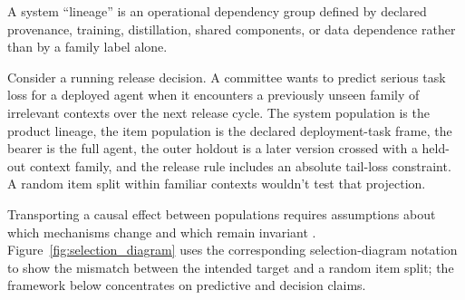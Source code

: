 \documentclass[12pt]{article}
\begin{document}
A system \enquote{lineage} is an operational dependency group defined by declared provenance, training, distillation, shared components, or data dependence rather than by a family label alone.

Consider a running release decision. A committee wants to predict serious task loss for a deployed agent when it encounters a previously unseen family of irrelevant contexts over the next release cycle. The system population is the product lineage, the item population is the declared deployment-task frame, the bearer is the full agent, the outer holdout is a later version crossed with a held-out context family, and the release rule includes an absolute tail-loss constraint. A random item split within familiar contexts wouldn't test that projection.

Transporting a causal effect between populations requires assumptions about which mechanisms change and which remain invariant \citep{pearlBareinboim2014externalValidity}. Figure~\ref{fig:selection_diagram} uses the corresponding selection-diagram notation to show the mismatch between the intended target and a random item split; the framework below concentrates on predictive and decision claims.
\end{document}
